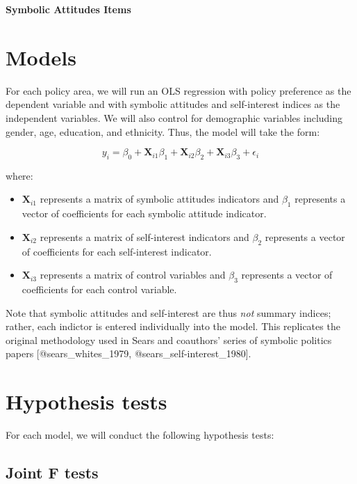 \documentclass[]{article}
\begin{document}
\textbf{Symbolic Attitudes Items}

\section{Models}\label{models}

For each policy area, we will run an OLS regression with policy
preference as the dependent variable and with symbolic attitudes and
self-interest indices as the independent variables. We will also control
for demographic variables including gender, age, education, and
ethnicity. Thus, the model will take the form:

\begin{equation}
y_i = \beta_0 + \textbf{X}_{i1}\beta_1 + \textbf{X}_{i2}\beta_2 +  \textbf{X}_{i3}\beta_3 + \epsilon_i 
\end{equation}

where:

\begin{itemize}
  \item $\textbf{X}_{i1}$ represents a matrix of symbolic attitudes indicators and $\beta_1$ represents a vector of coefficients for each symbolic attitude indicator.
  \item $\textbf{X}_{i2}$ represents a matrix of self-interest indicators and $\beta_2$ represents a vector of coefficients for each self-interest indicator.
  \item $\textbf{X}_{i3}$ represents a matrix of control variables and $\beta_3$ represents a vector of coefficients for each control variable.
\end{itemize}

Note that symbolic attitudes and self-interest are thus \emph{not}
summary indices; rather, each indictor is entered individually into the
model. This replicates the original methodology used in Sears and
coauthors' series of symbolic politics papers {[}@sears\_whites\_1979,
@sears\_self-interest\_1980{]}.

\section{Hypothesis tests}\label{hypothesis-tests}

For each model, we will conduct the following hypothesis tests:

\subsection{Joint F tests}\label{joint-f-tests}
\end{document}
